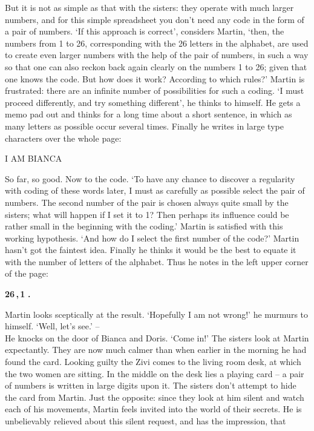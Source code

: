 \[\]
But it is not as simple as that with the sisters: they operate with much larger 
numbers, and for this simple spreadsheet you don't need any code in the form of a 
pair of numbers. 
`If this approach is correct', considers Martin, `then, the numbers from 1 to 26, 
corresponding with the 26 letters in the alphabet, are used to create even larger 
numbers with the help of the pair of numbers, in such a way so that one can also 
reckon back again clearly on the numbers 1 to 26; given that one knows the code.
But how does it work? According to which rules?' 
Martin is frustrated: there are an infinite number of possibilities for such a coding. 
`I must proceed differently, and try something different', he thinks to himself. 
He gets a memo pad out and thinks for a long time about a short sentence, in which 
as many letters as possible occur several times. 
Finally he writes in large type characters over the whole page: 
\begin{center} 
I AM BIANCA 
\end{center} 
So far, so good. Now to the code. 
`To have any chance to discover a regularity with coding of these words later, I 
must as carefully as possible select the pair of numbers. 
The second number of the pair is chosen always quite small by the sisters; what 
will happen if I set it to 1? 
Then perhaps its influence could be rather small in the beginning with the coding.'
Martin is satisfied with this working hypothesis. 
`And how do I select the first number of the code?' 
Martin hasn't got the faintest idea.
Finally he thinks it would be the best to equate it with the number of letters of the alphabet. 
Thus he notes in the left upper corner of the page: 
\begin{center}
{\bf 26\,,\,1\,\,.}
\end{center}
Martin looks sceptically at the result. 
`Hopefully I am not wrong!' he murmurs to himself. 
`Well, let's see.' -- \\ 
He knocks on the door of Bianca and Doris. `Come in!' 
The sisters look at Martin expectantly. They are now much calmer than when earlier 
in the morning he had found the card.
Looking guilty the Zivi comes to the living room desk, at which the two women are sitting. 
In the middle on the desk lies a playing card -- a pair of numbers is written in large 
digits upon it. 
The sisters don't attempt to hide the card from Martin. 
Just the opposite: since they look at him silent and watch each of his movements, 
Martin feels invited into the world of their secrets. 
He is unbelievably relieved about this silent request, and has the impression, that 
